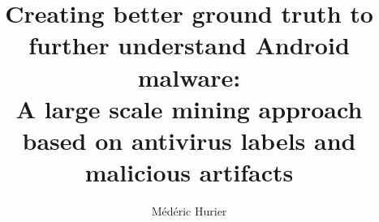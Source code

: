 \title{
Creating better ground truth to
further understand Android malware: \protect\\
A large scale mining approach based
on antivirus labels and malicious artifacts
}

\author{Médéric Hurier}
